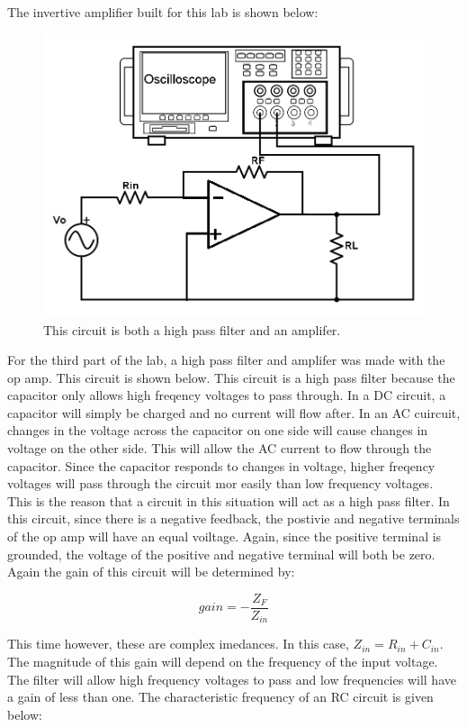 \documentclass[twocolumn, amsmath]{revtex4}
\begin{document}
The invertive amplifier built for this lab is shown below:

\begin{figure}[h]
    \includegraphics[scale=0.3]{inverting.png}  
    \caption{This circuit is both a high pass filter and an amplifer.}
\end{figure}

For the third part of the lab, a high pass filter and amplifer was made with the op amp. This circuit is shown below. This circuit is a high pass filter because the capacitor only allows high freqency voltages to pass through. In a DC circuit, a capacitor will simply be charged and no current will flow after. In an AC cuircuit, changes in the voltage across the capacitor on one side will cause changes in voltage on the other side. This will allow the AC current to flow through the capacitor. Since the capacitor responds to changes in voltage, higher freqency voltages will pass through the circuit mor easily than low frequency voltages. This is the reason that a circuit in this situation will act as a high pass filter. In this circuit, since there is a negative feedback, the postivie and negative terminals of the op amp will have an equal voiltage. Again, since the positive terminal is grounded, the voltage of the positive and negative terminal will both be zero. Again the gain of this circuit will be determined by:

\begin{equation}
gain =  -\frac{Z_{F}}{Z_{in}}
\end{equation}

This time however, these are complex imedances. In this case, $Z_{in} = R_{in} + C_{in}$. The magnitude of this gain will depend on the frequency of the input voltage. The filter will allow high frequency voltages to pass and low frequencies will have a gain of less than one. The characteristic frequency of an RC circuit is given below:
\end{document}
